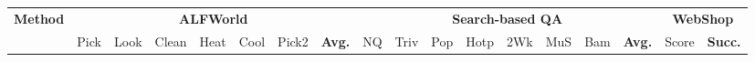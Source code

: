 \documentclass[10pt, logo, onecolumn, copyright]{nv}
\begin{document}
\begin{table}[t]
\centering
\fontsize{8.5}{9.5}\selectfont
\setlength{\tabcolsep}{3.5pt}
\renewcommand{\arraystretch}{1.15}
{%
\begin{tabular}{l@{\hspace{7pt}} ccccccc cccccccc cc}
\toprule
\multirow{2}{*}{\textbf{Method}}
& \multicolumn{7}{c}{\textbf{ALFWorld}}
& \multicolumn{8}{c}{\textbf{Search-based QA}}
& \multicolumn{2}{c}{\textbf{WebShop}} \\
\cmidrule(lr){2-8} \cmidrule(lr){9-16} \cmidrule(lr){17-18}
& Pick & Look & Clean & Heat & Cool & Pick2 & \cellcolor{gray!15}\textbf{Avg.}
& NQ & Triv & Pop & Hotp & 2Wk & MuS & Bam & \cellcolor{gray!15}\textbf{Avg.}
& Score & \cellcolor{gray!15}\textbf{Succ.} \\
\midrule


\end{tabular}}
\end{table}
\end{document}

